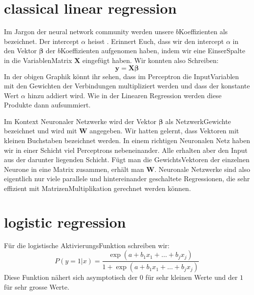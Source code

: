 \documentclass[letterpaper,10pt,english]{jupyterBook}
\begin{document}
\section{classical linear regression}
\label{\detokenize{Regression_Techniques:classical-linear-regression}}
\sphinxAtStartPar
Im Jargon der neural network community werden unsere \(b\)\sphinxhyphen{}Koeffizienten als  bezeichnet. Der intercept \(\alpha\) heisst .
Erinnert Euch, dass wir den intercept \(\alpha\) in den Vektor \(\pmb{\beta}\) der \(b\)\sphinxhyphen{}Koeffizienten aufgenomen haben, indem wir eine Einser\sphinxhyphen{}Spalte in die Variablen\sphinxhyphen{}Matrix \(\mathbf{X}\) eingefügt haben. Wir konnten also Schreiben:
\begin{equation*}\mathbf{y} = \mathbf{X} \pmb{\beta}\end{equation*}
\sphinxAtStartPar
In der obigen Graphik könnt ihr sehen, dass im Perceptron die Input\sphinxhyphen{}Variablen mit den Gewichten der Verbindungen multipliziert werden und dass der konstante Wert \(\alpha\) hinzu addiert wird. Wie in der Linearen Regression werden diese Produkte dann aufsummiert.

\sphinxAtStartPar
Im Kontext Neuronaler Netzwerke wird der Vektor \(\pmb{\beta}\) als Netzwerk\sphinxhyphen{}Gewichte bezeichnet und wird mit \(\mathbf{W}\) angegeben. Wir hatten gelernt, dass Vektoren mit kleinen Buchstaben bezeichnet werden. In einem richtigen Neuronalen Netz haben wir in einer Schicht viel Perceptrons nebeneinander. Alle erhalten aber den Input aus der darunter liegenden Schicht. Fügt man die Gewichts\sphinxhyphen{}Vektoren der einzelnen Neurone in eine Matrix zusammen, erhält man \(\mathbf{W}\).
Neuronale Netzwerke sind also eigentlich nur viele parallele und hintereinander geschaltete Regressionen, die sehr effizient mit Matrizen\sphinxhyphen{}Multiplikation gerechnet werden können.

\noindent{}


\section{logistic regression}
\label{\detokenize{Regression_Techniques:logistic-regression}}
\sphinxAtStartPar
Für die logistische Aktivierungs\sphinxhyphen{}Funktion schreiben wir:
\begin{equation*}
P(y=1 |x) = \frac{\exp(a + b_{1}x_1 + \ldots + b_jx_j)}{1 + \exp(a + b_{1}x_1 + \ldots + b_jx_j)}
\end{equation*}
\sphinxAtStartPar
Diese Funktion nähert sich asymptotisch der \(0\) für sehr kleinen Werte und der \(1\) für sehr grosse Werte.
\end{document}
